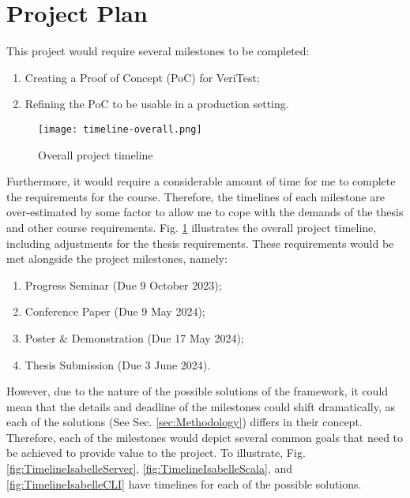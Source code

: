 \section{Project Plan}

This project would require several milestones to be completed:
\begin{enumerate}
    \item Creating a Proof of Concept (PoC) for VeriTest;
    \item Refining the PoC to be usable in a production setting.
\end{enumerate}

\begin{figure}[h]
    \centering
    \texttt{[image: timeline-overall.png]}
    \caption{Overall project timeline}
    \label{fig:TimelineOverall}
\end{figure}

Furthermore, it would require a considerable amount of time for me to complete the requirements for the course.
Therefore, the timelines of each milestone are over-estimated by some factor to allow me to cope with 
the demands of the thesis and other course requirements. Fig. \ref{fig:TimelineOverall} illustrates the overall 
project timeline, including adjustments for the thesis requirements. These requirements would be met alongside 
the project milestones, namely:

\begin{enumerate}
    \item Progress Seminar (Due 9 October 2023);
    \item Conference Paper (Due 9 May 2024);
    \item Poster \& Demonstration (Due 17 May 2024);
    \item Thesis Submission (Due 3 June 2024).
\end{enumerate}

However, due to the nature of the possible solutions of the framework, it could mean that the details and deadline 
of the milestones could shift dramatically, as each of the solutions (See Sec. \ref{sec:Methodology}) differs in 
their concept. Therefore, each of the milestones would depict several common goals that need to be achieved to 
provide value to the project. To illustrate, Fig. \ref{fig:TimelineIsabelleServer}, \ref{fig:TimelineIsabelleScala}, 
and \ref{fig:TimelineIsabelleCLI} have timelines for each of the possible solutions.

